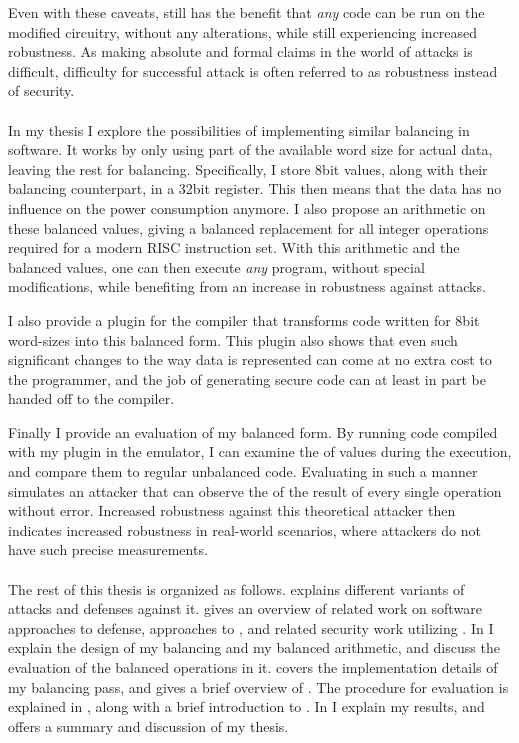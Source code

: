 Even with these caveats, \dual{} still has the benefit that \emph{any} code can be run on the modified circuitry, without any alterations, while still experiencing increased robustness.
As making absolute and formal claims in the world of \sidechannel{} attacks is difficult, difficulty for successful attack is often referred to as robustness instead of security.
\\
\\
In my thesis I explore the possibilities of implementing similar balancing in software.
It works by only using part of the available word size for actual data, leaving the rest for balancing.
Specifically, I store 8bit values, along with their balancing counterpart, in a 32bit register.
This then means that the data has no influence on the power consumption anymore.
I also propose an arithmetic on these balanced values, giving a balanced replacement for all integer operations required for a modern RISC instruction set.
With this arithmetic and the balanced values, one can then execute \emph{any} program, without special modifications, while benefiting from an increase in robustness against \poweranalysis{} attacks.

I also provide a plugin for the \llvm{} compiler that transforms code written for 8bit word-sizes into this balanced form.
This plugin also shows that even such significant changes to the way data is represented can come at no extra cost to the programmer, and the job of generating secure code can at least in part be handed off to the compiler.

Finally I provide an evaluation of my balanced form.
By running code compiled with my plugin in the \qemu{} emulator, I can examine the \hammingw{} of values during the execution, and compare them to regular unbalanced code.
Evaluating in such a manner simulates an attacker that can observe the \hammingw{} of the result of every single operation without error.
Increased robustness against this theoretical attacker then indicates increased robustness in real-world scenarios, where attackers do not have such precise measurements.
\\
\\
The rest of this thesis is organized as follows.
 explains different variants of \poweranalysis{} attacks and defenses against it.
 gives an overview of related work on software approaches to \poweranalysis{} defense, approaches to \dual{}, and related security work utilizing \llvm{}.
In  I explain the design of my balancing and my balanced arithmetic, and discuss the evaluation of the balanced operations in it.
 covers the implementation details of my balancing pass, and gives a brief overview of \llvm{}.
The procedure for evaluation is explained in , along with a brief introduction to \qemu{}.
In  I explain my results, and  offers a summary and discussion of my thesis.
